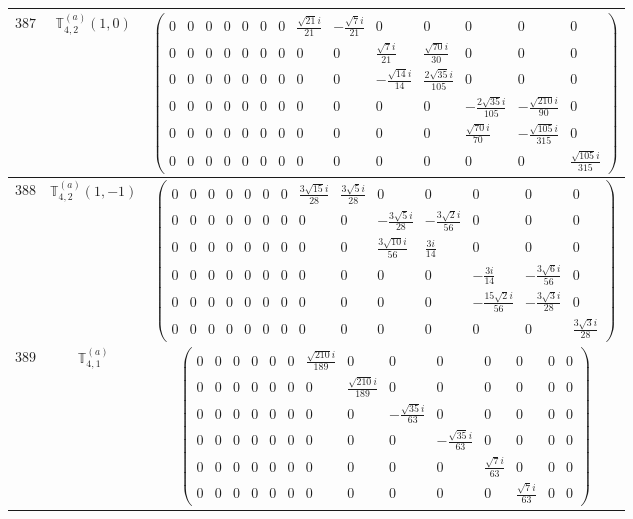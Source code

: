 \documentclass[fleqn,8pt,landscape]{jsarticle}
\begin{document}
\begin{center}
\begin{longtable}{ccc}
$ 387 $ & $ \mathbb{T}_{4,2}^{(a)}(1,0) $ & $ \begin{pmatrix} 0 & 0 & 0 & 0 & 0 & 0 & 0 & \frac{\sqrt{21} i}{21} & - \frac{\sqrt{7} i}{21} & 0 & 0 & 0 & 0 & 0 \\ 0 & 0 & 0 & 0 & 0 & 0 & 0 & 0 & 0 & \frac{\sqrt{7} i}{21} & \frac{\sqrt{70} i}{30} & 0 & 0 & 0 \\ 0 & 0 & 0 & 0 & 0 & 0 & 0 & 0 & 0 & - \frac{\sqrt{14} i}{14} & \frac{2 \sqrt{35} i}{105} & 0 & 0 & 0 \\ 0 & 0 & 0 & 0 & 0 & 0 & 0 & 0 & 0 & 0 & 0 & - \frac{2 \sqrt{35} i}{105} & - \frac{\sqrt{210} i}{90} & 0 \\ 0 & 0 & 0 & 0 & 0 & 0 & 0 & 0 & 0 & 0 & 0 & \frac{\sqrt{70} i}{70} & - \frac{\sqrt{105} i}{315} & 0 \\ 0 & 0 & 0 & 0 & 0 & 0 & 0 & 0 & 0 & 0 & 0 & 0 & 0 & \frac{\sqrt{105} i}{315} \end{pmatrix} $ \\ \hline
$ 388 $ & $ \mathbb{T}_{4,2}^{(a)}(1,-1) $ & $ \begin{pmatrix} 0 & 0 & 0 & 0 & 0 & 0 & 0 & \frac{3 \sqrt{15} i}{28} & \frac{3 \sqrt{5} i}{28} & 0 & 0 & 0 & 0 & 0 \\ 0 & 0 & 0 & 0 & 0 & 0 & 0 & 0 & 0 & - \frac{3 \sqrt{5} i}{28} & - \frac{3 \sqrt{2} i}{56} & 0 & 0 & 0 \\ 0 & 0 & 0 & 0 & 0 & 0 & 0 & 0 & 0 & \frac{3 \sqrt{10} i}{56} & \frac{3 i}{14} & 0 & 0 & 0 \\ 0 & 0 & 0 & 0 & 0 & 0 & 0 & 0 & 0 & 0 & 0 & - \frac{3 i}{14} & - \frac{3 \sqrt{6} i}{56} & 0 \\ 0 & 0 & 0 & 0 & 0 & 0 & 0 & 0 & 0 & 0 & 0 & - \frac{15 \sqrt{2} i}{56} & - \frac{3 \sqrt{3} i}{28} & 0 \\ 0 & 0 & 0 & 0 & 0 & 0 & 0 & 0 & 0 & 0 & 0 & 0 & 0 & \frac{3 \sqrt{3} i}{28} \end{pmatrix} $ \\ \hline
$ 389 $ & $ \mathbb{T}_{4,1}^{(a)} $ & $ \begin{pmatrix} 0 & 0 & 0 & 0 & 0 & 0 & \frac{\sqrt{210} i}{189} & 0 & 0 & 0 & 0 & 0 & 0 & 0 \\ 0 & 0 & 0 & 0 & 0 & 0 & 0 & \frac{\sqrt{210} i}{189} & 0 & 0 & 0 & 0 & 0 & 0 \\ 0 & 0 & 0 & 0 & 0 & 0 & 0 & 0 & - \frac{\sqrt{35} i}{63} & 0 & 0 & 0 & 0 & 0 \\ 0 & 0 & 0 & 0 & 0 & 0 & 0 & 0 & 0 & - \frac{\sqrt{35} i}{63} & 0 & 0 & 0 & 0 \\ 0 & 0 & 0 & 0 & 0 & 0 & 0 & 0 & 0 & 0 & \frac{\sqrt{7} i}{63} & 0 & 0 & 0 \\ 0 & 0 & 0 & 0 & 0 & 0 & 0 & 0 & 0 & 0 & 0 & \frac{\sqrt{7} i}{63} & 0 & 0 \end{pmatrix} $ \\ \hline

\end{longtable}
\end{center}
\end{document}

